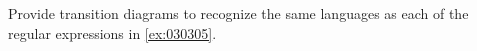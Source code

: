 \begin{exercise}\label{ex:030402}
    Provide transition diagrams to recognize the same languages as each of the 
    regular expressions in \cref{ex:030305}.
\end{exercise}
\begin{solution}\label{sol:030402}
\end{solution}